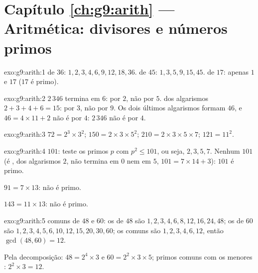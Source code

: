 \section*{Capítulo \ref{ch:g9:arith} --- Aritmética: divisores e números primos}

\begin{solution}{exo:g9:arith:1}
 de $36$: $1, 2, 3, 4, 6, 9, 12, 18, 36$.
 de $45$: $1, 3, 5, 9, 15, 45$.
 de $17$: apenas $1$ e $17$ ($17$ é primo).
\end{solution}

\begin{solution}{exo:g9:arith:2}
$2\,346$ termina em $6$:  por $2$, não por $5$.  dos
algarismos $2 + 3 + 4 + 6 = 15$:  por $3$, não por $9$. Os
dois últimos algarismos formam $46$, e $46 = 4 \times 11 + 2$ não é
 por $4$: $2\,346$ não é  por $4$.
\end{solution}

\begin{solution}{exo:g9:arith:3}
$72 = 2^3 \times 3^2$; \quad
$150 = 2 \times 3 \times 5^2$; \quad
$210 = 2 \times 3 \times 5 \times 7$; \quad
$121 = 11^2$.
\end{solution}

\begin{solution}{exo:g9:arith:4}
$101$: teste os primos $p$ com $p^2 \leq 101$, ou seja, $2, 3, 5, 7$.
Nenhum  $101$ (é ,  dos algarismos $2$, não termina em
$0$ nem em $5$, $101 = 7 \times 14 + 3$): $101$ é primo.

$91 = 7 \times 13$: não é primo.

$143 = 11 \times 13$: não é primo.
\end{solution}

\begin{solution}{exo:g9:arith:5}
 comuns de $48$ e $60$: os  de $48$ são $1, 2, 3, 4,
6, 8, 12, 16, 24, 48$; os de $60$ são $1, 2, 3, 4, 5, 6, 10, 12, 15,
20, 30, 60$; os comuns são $1, 2, 3, 4, 6, 12$, então
$\gcd(48,60) = 12$.

Pela decomposição: $48 = 2^4 \times 3$ e
$60 = 2^2 \times 3 \times 5$; primos comuns com os menores :
$2^2 \times 3 = 12$.
\end{solution}

